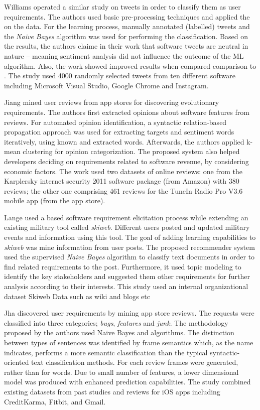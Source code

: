 Williams \etal \cite{Williams:2017} operated a similar study on tweets in order
to classify them as user requirements. The authors used basic pre-processing
techniques and applied the \VSM on the data. For the learning process, manually
annotated (labelled) tweets and the \emph{Naive Bayes} algorithm was used for
performing the classification. Based on the results, the authors claime in their
work that software tweets are neutral in nature -- meaning sentiment analysis
did not influence the outcome of the ML algorithm. Also, the work showed
improved results when compared comparison to \cite{Guzman:2017}.
The study used 4000 randomly selected tweets from ten different software
including Microsoft Visual Studio, Google Chrome and Instagram.

Jiang \etal \cite{Jiang:2014} mined user reviews from app stores for discovering
evolutionary requirements. The authors first extracted opinions about software
features from reviews. For automated opinion identification, a syntactic
relation-based propagation approach was used for extracting targets and
sentiment words iteratively, using known and extracted words. Afterwards, the
authors applied k-mean clustering for opinion categorization. The proposed
system also helped developers deciding on requirements related to software
revenue, by considering economic factors. The work used two datasets of online
reviews: one from the Karplersky internet security 2011 software package (from Amazon) with 380
reviews; the other one comprising 461 reviews for the TuneIn Radio Pro V3.6
mobile app (from the app store).

Lange \etal\cite{Douglas:S2008} used a \ML based software
requirement elicitation process while extending an existing military tool called
\emph{skiweb}.  Different users posted and updated military events and
information using this tool. The goal of adding learning capabilities to
\emph{skiweb} was mine information from user posts. The proposed recommender
system used the supervised \emph{Naive Bayes} algorithm to classify text
documents in order to find related requirements to the post. Furthermore, it used topic
modeling to identify the key stakeholders and suggested them other requirements
for further analysis according to their interests. This study used an internal
organizational dataset Skiweb Data such as wiki and blogs etc

Jha \etal \cite{Jha:2017} discovered user requirements by mining app store
reviews. The requests were classified into three categories; \emph{bugs},
\emph{features} and \emph{junk}. The methodology proposed by the authors used
Naive Bayes and \SVM algorithms. The distinction between types of sentences was
identified by frame semantics  which, as the name indicates, performs
a more semantic classification than the typical syntactic-oriented text
classification methods. For each review frames were generated, rather than for
words. Due to small number of features, a lower dimensional model was
produced with enhanced prediction capabilities. The study combined existing
datasets from past studies and reviews for iOS apps including CreditKarma,
Fitbit, and Gmail.

